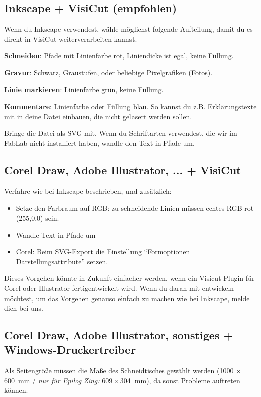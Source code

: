 \documentclass{\basedir/fablab-document}
\newcommand{\nurZing}{\emph{nur für Epilog Zing:} }
\begin{document}
	\subsection{Inkscape + VisiCut (empfohlen)}
	Wenn du Inkscape verwendest, wähle möglichst folgende Aufteilung, damit du es direkt in VisiCut weiterverarbeiten kannst.

	\textbf{Schneiden}: Pfade mit Linienfarbe rot, Liniendicke ist egal, keine Füllung.

	\textbf{Gravur}: Schwarz, Graustufen, oder beliebige Pixelgrafiken (Fotos).

	\textbf{Linie markieren}: Linienfarbe grün, keine Füllung.

	\textbf{Kommentare}: Linienfarbe oder Füllung blau. So kannst du z.B. Erklärungstexte mit in deine Datei einbauen, die nicht gelasert werden sollen.

	Bringe die Datei als SVG mit. Wenn du Schriftarten verwendest, die wir im FabLab nicht installiert haben, wandle den Text in Pfade um.


	\subsection{Corel Draw, Adobe Illustrator, ... + VisiCut}
	\label{corel-illustrator-svg-visicut}
	Verfahre wie bei Inkscape beschrieben, und zusätzlich:

	\begin{itemize}
		\item Setze den Farbraum auf RGB: zu schneidende Linien müssen echtes RGB-rot (255,0,0) sein.
		\item Wandle Text in Pfade um
		\item Corel: Beim SVG-Export die Einstellung \enquote{Formoptionen = Darstellungsattribute} setzen.
	\end{itemize}

	Dieses Vorgehen könnte in Zukunft einfacher werden, wenn ein Visicut-Plugin für Corel oder Illustrator fertigentwickelt wird. Wenn du daran mit entwickeln möchtest, um das Vorgehen genauso einfach zu machen wie bei Inkscape, melde dich bei uns.

	\subsection{Corel Draw, Adobe Illustrator, sonstiges + Windows-Druckertreiber} \label{sec:einstellungen-windowstreiber}
	Als Seitengröße müssen die Maße des Schneidtisches gewählt werden (1000 $\times$ 600~mm / \nurZing 609\,$\times$\,304~mm), da sonst Probleme auftreten können.
\end{document}
